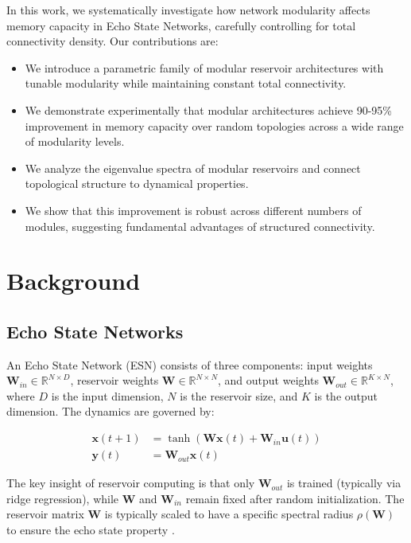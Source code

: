 \documentclass{article}
\begin{document}
In this work, we systematically investigate how network modularity affects memory capacity in Echo State Networks, carefully controlling for total connectivity density. Our contributions are:

\begin{itemize}
\item We introduce a parametric family of modular reservoir architectures with tunable modularity while maintaining constant total connectivity.
\item We demonstrate experimentally that modular architectures achieve 90-95\% improvement in memory capacity over random topologies across a wide range of modularity levels.
\item We analyze the eigenvalue spectra of modular reservoirs and connect topological structure to dynamical properties.
\item We show that this improvement is robust across different numbers of modules, suggesting fundamental advantages of structured connectivity.
\end{itemize}

\section{Background}

\subsection{Echo State Networks}

An Echo State Network (ESN) consists of three components: input weights $\mathbf{W}_{in} \in \mathbb{R}^{N \times D}$, reservoir weights $\mathbf{W} \in \mathbb{R}^{N \times N}$, and output weights $\mathbf{W}_{out} \in \mathbb{R}^{K \times N}$, where $D$ is the input dimension, $N$ is the reservoir size, and $K$ is the output dimension. The dynamics are governed by:

\begin{align}
\mathbf{x}(t+1) &= \tanh(\mathbf{W}\mathbf{x}(t) + \mathbf{W}_{in}\mathbf{u}(t)) \label{eq:esn_dynamics}\\
\mathbf{y}(t) &= \mathbf{W}_{out}\mathbf{x}(t) \label{eq:esn_output}
\end{align}

The key insight of reservoir computing is that only $\mathbf{W}_{out}$ is trained (typically via ridge regression), while $\mathbf{W}$ and $\mathbf{W}_{in}$ remain fixed after random initialization. The reservoir matrix $\mathbf{W}$ is typically scaled to have a specific spectral radius $\rho(\mathbf{W})$ to ensure the echo state property \cite{jaeger2001echo}.
\end{document}
